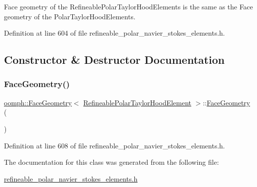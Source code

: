 Face geometry of the Refineable\+Polar\+Taylor\+Hood\+Elements is the same as the Face geometry of the Polar\+Taylor\+Hood\+Elements. 

Definition at line 604 of file refineable\+\_\+polar\+\_\+navier\+\_\+stokes\+\_\+elements.\+h.



\subsection{Constructor \& Destructor Documentation}
\mbox{\label{classoomph_1_1FaceGeometry_3_01RefineablePolarTaylorHoodElement_01_4_ae2d770c854faec2fd7b4a5725764d4db}} 
\subsubsection{\texorpdfstring{Face\+Geometry()}{FaceGeometry()}}
{\footnotesize\ttfamily \hyperlink{classoomph_1_1FaceGeometry}{oomph\+::\+Face\+Geometry}$<$ \hyperlink{classoomph_1_1RefineablePolarTaylorHoodElement}{Refineable\+Polar\+Taylor\+Hood\+Element} $>$\+::\hyperlink{classoomph_1_1FaceGeometry}{Face\+Geometry} (\begin{DoxyParamCaption}{ }\end{DoxyParamCaption})\hspace{0.3cm}{\ttfamily [inline]}}



Definition at line 608 of file refineable\+\_\+polar\+\_\+navier\+\_\+stokes\+\_\+elements.\+h.



The documentation for this class was generated from the following file\+:\begin{DoxyCompactItemize}
\item 
\hyperlink{refineable__polar__navier__stokes__elements_8h}{refineable\+\_\+polar\+\_\+navier\+\_\+stokes\+\_\+elements.\+h}\end{DoxyCompactItemize}
